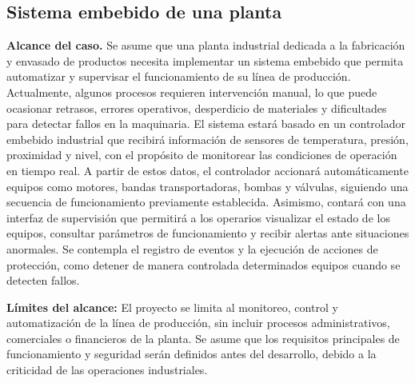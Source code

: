 \subsection{Sistema embebido de una planta}

\textbf{Alcance del caso.} Se asume que una planta industrial dedicada a la
fabricación y envasado de productos necesita
implementar un sistema embebido que permita
automatizar y supervisar el funcionamiento de su
línea de producción. Actualmente, algunos procesos
requieren intervención manual, lo que puede
ocasionar retrasos, errores operativos, desperdicio
de materiales y dificultades para detectar fallos
en la maquinaria.
El sistema estará basado en un controlador embebido industrial que
recibirá información de sensores de temperatura,
presión, proximidad y nivel, con el propósito de
monitorear las condiciones de operación en tiempo
real. A partir de estos datos, el controlador
accionará automáticamente equipos como motores,
bandas transportadoras, bombas y válvulas,
siguiendo una secuencia de funcionamiento
previamente establecida. Asimismo, contará con una interfaz de supervisión
que permitirá a los operarios visualizar el estado
de los equipos, consultar parámetros de
funcionamiento y recibir alertas ante situaciones
anormales. Se contempla el registro de eventos
y la ejecución de acciones de protección, como
detener de manera controlada determinados equipos
cuando se detecten fallos.

\textbf{Límites del alcance:}
El proyecto se limita al monitoreo, control y
automatización de la línea de producción, sin
incluir procesos administrativos, comerciales
o financieros de la planta.
Se asume que los requisitos principales de
funcionamiento y seguridad serán definidos antes
del desarrollo, debido a la criticidad de las
operaciones industriales.

